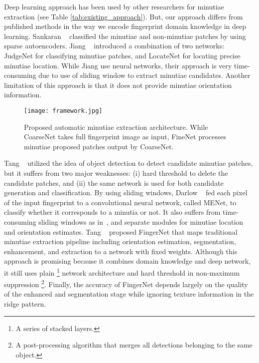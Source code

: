 \documentclass[10pt,twocolumn,letterpaper]{article}
\begin{document}
Deep learning approach has been used by other researchers for minutiae extraction (see Table \ref{tab:existing_approach}). But, our approach differs from published methods in the way we encode fingerprint domain knowledge in deep learning. Sankaran \etal~\cite{sankaran2014latent} classified the minutiae and non-minutiae patches by using sparse autoencoders. Jiang \etal~\cite{jiang2016direct} introduced a combination of two networks: JudgeNet for classifying minutiae patches, and LocateNet for locating precise minutiae location. While Jiang \etal use neural networks, their approach is very time-consuming due to use of sliding window to extract minutiae candidates. Another limitation of this approach is that it does not provide minutiae orientation information.

\begin{figure*}[!tbp]
\centering
\texttt{[image: framework.jpg]}
\caption{Proposed automatic minutiae extraction architecture. While CoarseNet takes full fingerprint image as input, FineNet processes minutiae proposed patches output by CoarseNet.}
\label{fig:Full_architecture}
\end{figure*}

Tang \etal~\cite{tang2017CNN} utilized the idea of object detection to detect candidate minutiae patches, but it suffers from two major weaknesses: (i) hard threshold to delete the candidate patches, and (ii) the same network is used for both candidate generation and classification. By using sliding windows, Darlow \etal~\cite{Darlow2017DeepLearn} fed each pixel of the input fingerprint to a convolutional neural network, called MENet, to classify whether it corresponds to a minutia or not. It also suffers from time-consuming sliding windows as in~\cite{jiang2016direct}, and separate modules for minutiae location and orientation estimates. Tang \etal~\cite{tang2017FingerNet} proposed FingerNet that maps traditional minutiae extraction pipeline including orientation estimation, segmentation, enhancement, and extraction to a network with fixed weights. Although this approach is promising because it combines domain knowledge and deep network, it still uses plain \footnote{A series of stacked layers.} network architecture and hard threshold in non-maximum suppression \footnote{A post-processing algorithm that merges all detections belonging to the same object.}. Finally, the accuracy of FingerNet depends largely on the quality of the enhanced and segmentation stage while ignoring texture information in the ridge pattern.
\end{document}
